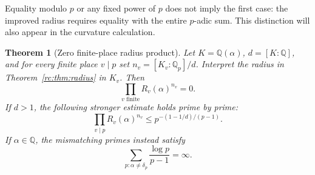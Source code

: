 \documentclass[11pt,a4paper]{article}
\newtheorem{theorem}{Theorem}[section]
\theoremstyle{definition}
\theoremstyle{remark}
\theoremstyle{plain}
\numberwithin{equation}{section}
\providecommand{\rcQ}{\mathbb Q}
\begin{document}
Equality modulo $p$ or any fixed power of $p$ does not imply the first
case: the improved radius requires equality with the entire $p$-adic
sum.  This distinction will also appear in the curvature calculation.

\begin{theorem}[Zero finite-place radius product]\label{rc:thm:radius-product}
Let $K=\rcQ(\alpha)$, $d=[K:\rcQ]$, and for every finite place
$v\mid p$ set $n_v=[K_v:\rcQ_p]/d$.  Interpret the radius in
Theorem~\ref{rc:thm:radius} in $K_v$.  Then
\begin{equation}\label{rc:eq:radius-product}
 \prod_{v\text{ finite}}R_v(\alpha)^{n_v}=0.
\end{equation}
If $d>1$, the following stronger estimate holds prime by prime:
\begin{equation}\label{rc:eq:radius-per-prime}
 \prod_{v\mid p}R_v(\alpha)^{n_v}
 \le p^{-(1-1/d)/(p-1)}.
\end{equation}
If $\alpha\in\rcQ$, the mismatching primes instead satisfy
\begin{equation}\label{rc:eq:mismatch-divergence}
 \sum_{p:\alpha\ne\delta_p}\frac{\log p}{p-1}=\infty.
\end{equation}
\end{theorem}
\end{document}
